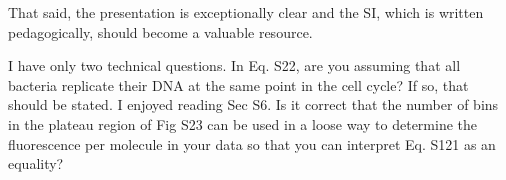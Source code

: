 That said, the presentation is exceptionally clear and the SI, which is written
pedagogically, should become a valuable resource.

I have only two technical questions. In Eq. S22, are you assuming that all
bacteria replicate their DNA at the same point in the cell cycle? If so, that
should be stated. I enjoyed reading Sec S6. Is it correct that the number of
bins in the plateau region of Fig S23 can be used in a loose way to determine
the fluorescence per molecule in your data so that you can interpret Eq. S121 as
an equality?
